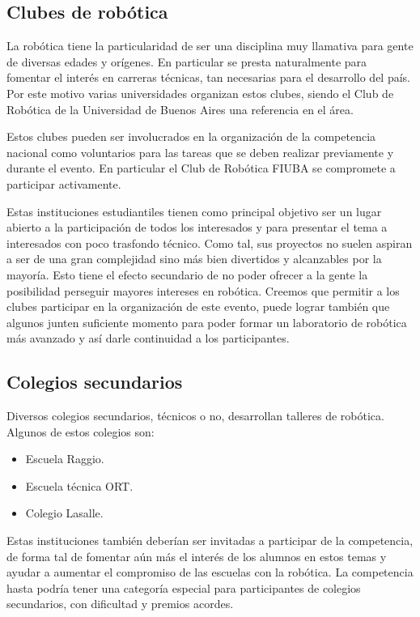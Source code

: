 \documentclass[a4paper,12pt]{article}
\begin{document}
\subsection{Clubes de robótica}

La robótica tiene la particularidad de ser una disciplina muy llamativa para gente de diversas edades y orígenes. En particular se presta naturalmente para fomentar el interés en carreras técnicas, tan necesarias para el desarrollo del país. Por este motivo varias universidades organizan estos clubes, siendo el Club de Robótica de la Universidad de Buenos Aires una referencia en el área.

Estos clubes pueden ser involucrados en la organización de la competencia nacional como voluntarios para las tareas que se deben realizar previamente y durante el evento. En particular el Club de Robótica FIUBA se compromete a participar activamente.

Estas instituciones estudiantiles tienen como principal objetivo ser un lugar abierto a la participación de todos los interesados y para presentar el tema a interesados con poco trasfondo técnico. Como tal, sus proyectos no suelen aspiran a ser de una gran complejidad sino más bien divertidos y alcanzables por la mayoría. Esto tiene el efecto secundario de no poder ofrecer a la gente la posibilidad perseguir mayores intereses en robótica. Creemos que permitir a los clubes participar en la organización de este evento, puede lograr también que algunos junten suficiente momento para poder formar un laboratorio de robótica más avanzado y así darle continuidad a los participantes.

\subsection{Colegios secundarios}

Diversos colegios secundarios, técnicos o no, desarrollan talleres de robótica. Algunos de estos colegios son:

\begin{itemize}
 \item Escuela Raggio.
 \item Escuela técnica ORT.
 \item Colegio Lasalle.
\end{itemize}

Estas instituciones también deberían ser invitadas a participar de la competencia, de forma tal de fomentar aún más el interés de los alumnos en estos temas y ayudar a aumentar el compromiso de las escuelas con la robótica. La competencia hasta podría tener una categoría especial para participantes de colegios secundarios, con dificultad y premios acordes.
\end{document}
